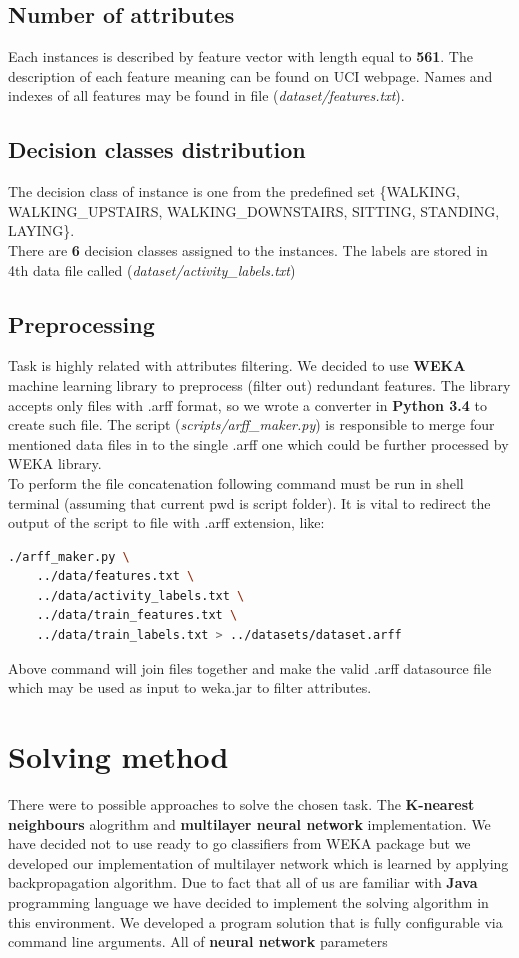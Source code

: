 \documentclass[12pt,a4paper]{article}
\begin{document}
\subsection{Number of attributes}
Each instances is described by feature vector with length equal to \textbf{561}. The description of each feature meaning can be found on UCI webpage. Names and indexes of all features may be found in file (\textit{dataset/features.txt}).
\subsection{Decision classes distribution}
The decision class of instance is one from the predefined set \{WALKING, WALKING{\_}UPSTAIRS, WALKING{\_}DOWNSTAIRS, SITTING, STANDING, LAYING\}.\\
There are \textbf{6} decision classes assigned to the instances. The labels are stored in 4th data file called (\textit{dataset/activity{\_}labels.txt})
\subsection{Preprocessing}
Task is highly related with attributes filtering. We decided to use \textbf{WEKA} machine learning library to preprocess (filter out) redundant features. The library accepts only files with .arff format, so we wrote a converter in \textbf{Python 3.4} to create such file. The script (\textit{scripts/arff{\_}maker.py}) is responsible to merge four mentioned data files in to the single .arff one which could be further processed by WEKA library.\\
To perform the file concatenation following command must be run in shell terminal (assuming that current pwd is script folder). It is vital to redirect the output of the script to file with .arff extension, like:\\
\begin{lstlisting}[language=bash]
  ./arff_maker.py \
    ../data/features.txt \
    ../data/activity_labels.txt \
    ../data/train_features.txt \
    ../data/train_labels.txt > ../datasets/dataset.arff
\end{lstlisting}

Above command will join files together and make the valid .arff datasource file which may be used as input to weka.jar to filter attributes.

\section{Solving method}
There were to possible approaches to solve the chosen task. The \textbf{K-nearest neighbours} alogrithm and \textbf{multilayer neural network} implementation. We have decided not to use ready to go classifiers from WEKA package but we developed our implementation of multilayer network which is learned by applying backpropagation algorithm. Due to fact that all of us are familiar with \textbf{Java} programming language we have decided to implement the solving algorithm in this environment. We developed a program solution that is fully configurable via command line arguments. All of \textbf{neural network} parameters 
\end{document}

